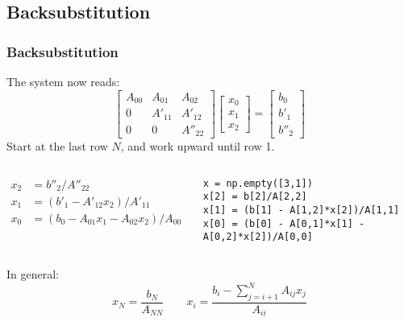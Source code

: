 \subsection*{Backsubstitution}
\begin{frame}[fragile]
  \frametitle{Backsubstitution}
  The system now reads:
  \[
    \begin{bmatrix}
      A_{00} & A_{01} & A_{02}\\ 
      0      & A'_{11} & A'_{12}\\ 
      0 & 0 & A''_{22}
    \end{bmatrix}
    \begin{bmatrix}x_0\\x_1\\x_2\end{bmatrix} = 
    \begin{bmatrix}b_0\\b'_1\\b''_2\end{bmatrix}
  \]
  \pause
  Start at the last row $N$, and work upward until row 1.
  \begin{columns}
    \begin{align*}
     x_2 &= b''_2/A''_{22}\\
     x_1 &= (b'_1 - A'_{12}x_2)/A'_{11}\\
     x_0 &= (b_0 - A_{01}x_1 - A_{02}x_2)/A_{00}
    \end{align*}
    \pause
    \begin{lstlisting}
x = np.empty([3,1])
x[2] = b[2]/A[2,2]
x[1] = (b[1] - A[1,2]*x[2])/A[1,1]
x[0] = (b[0] - A[0,1]*x[1] - A[0,2]*x[2])/A[0,0]
    \end{lstlisting}
\end{columns}
In general:
\[
 x_N = \frac{b_N}{A_{NN}} \qquad x_i = \frac{b_i - \sum_{j=i+1}^{N}A_{ij}x_j}{A_{ii}}
\]
\end{frame}

